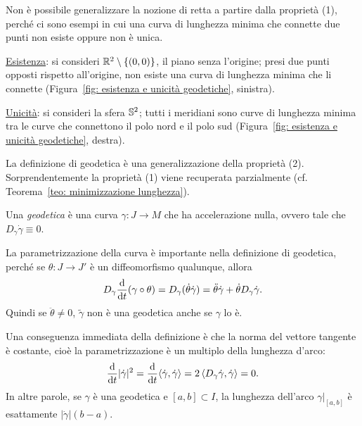 	Non è possibile generalizzare la nozione di retta a partire dalla proprietà (1), perché ci sono esempi in cui una curva di lunghezza minima che connette due punti non esiste oppure non è unica.
	
	\underline{Esistenza}: si consideri \(\mathbb{R}^2 \setminus\{(0,0)\}\), il piano senza l'origine; presi due punti opposti rispetto all'origine, non esiste una curva di lunghezza minima che li connette (Figura~\ref{fig: esistenza e unicità geodetiche}, sinistra).
	
	\underline{Unicità}: si consideri la sfera \(\mathbb{S}^2\); tutti i meridiani sono curve di lunghezza minima tra le curve che connettono il polo nord e il polo sud (Figura~\ref{fig: esistenza e unicità geodetiche}, destra).
	
	
	
	La definizione di geodetica è una generalizzazione della proprietà (2). Sorprendentemente la proprietà (1) viene recuperata parzialmente (cf. Teorema~\ref{teo: minimizzazione lunghezza}). 
	
	\begin{defi}
		Una \textit{geodetica} è una curva \(\gamma: J \to M\) che ha accelerazione nulla, ovvero tale che \(D_\gamma\dot \gamma \equiv 0\).
	\end{defi}
	
	La parametrizzazione della curva è importante nella definizione di geodetica, perché se \(\theta:J \to J'\) è un diffeomorfismo qualunque, allora
	\begin{equation}\label{eq: riparametrizzazione geodetica}
		D_\gamma \frac{\mathrm{d}}{\mathrm{d} t} (\gamma \circ \theta) = D_\gamma( \dot \theta \dot \gamma) = \ddot \theta\dot \gamma + \dot \theta D_\gamma \dot \gamma.
	\end{equation}
	Quindi se \(\ddot \theta \neq 0\), $\widetilde{\gamma}$ non è una geodetica anche se \(\gamma\) lo è.
	
	Una conseguenza immediata della definizione è che la norma del vettore tangente è costante, cioè la parametrizzazione è un multiplo della lunghezza d'arco:
	\begin{equation}
	\frac{\mathrm{d}}{\mathrm{d} t} |\dot \gamma |^2 = \frac{\mathrm{d}}{\mathrm{d} t} \langle \dot \gamma, \dot \gamma \rangle = 2 \left\langle D_\gamma \dot \gamma, \dot \gamma \right\rangle =0.
	\end{equation}
	In altre parole, se \(\gamma\) è una geodetica e \([a,b]\subset I\), la lunghezza dell'arco \(\gamma|_{[a,b]}\) è esattamente \(|\dot \gamma|(b-a)\).
	
